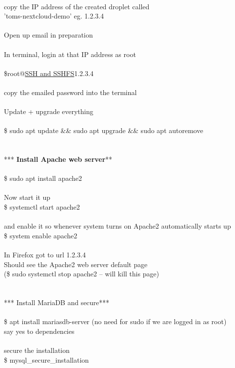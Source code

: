 \documentclass[10pt,a4paper]{article}
\begin{document}
{\large \\
	copy the IP address of the created droplet called \\
		'toms-nextcloud-demo' eg. 1.2.3.4\\
\\
	Open up email in preparation\\
\\
	In terminal, login at that IP address as root\\
\\
		\$root@\hyperlink{ssh___and_sshfs}{SSH   and SSHFS}}{\large  1.2.3.4\\
\\
	copy the emailed password into the terminal\\
\\
	Update + upgrade everything\\
\\
		\$ sudo apt update \&\& sudo apt upgrade \&\& sudo apt autoremove\\
\\
\\
*** \textbf{Install Apache web server}}{\large  ***\\
\\
	\$ sudo apt install apache2\\
\\
	Now start it up\\
	\$ systemctl start apache2\\
\\
	and enable it so whenever system turns on Apache2 automatically starts up\\
	\$ system enable apache2\\
\\
	In Firefox got to url 1.2.3.4\\
	Should see the Apache2 web server default page\\
	(\$ sudo systemctl stop apache2   -- will kill this page)\\
\\
	\\
*** Install MariaDB and secure***\\
\\
	\$ apt install mariasdb-server   (no need for sudo if we are logged in as root)\\
	say yes to dependencies\\
\\
	secure the installation\\
	\$ mysql\_secure\_installation\\
}
\end{document}
